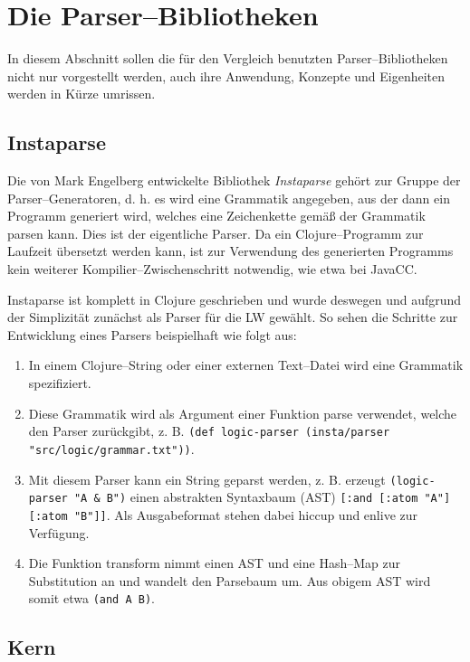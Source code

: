 \documentclass[ngerman,a4paper,abstracton,open=right,twoside=false,toc=listofnumbered,bibtotocnumbered]{scrreprt}
\begin{document}
\section{Die Parser--Bibliotheken}

In diesem Abschnitt sollen die für den Vergleich benutzten Parser--Bibliotheken nicht nur vorgestellt werden, auch ihre Anwendung, Konzepte und Eigenheiten werden in Kürze umrissen.

\subsection{Instaparse}

Die von Mark Engelberg entwickelte Bibliothek \emph{Instaparse} gehört zur Gruppe der Parser--Generatoren, d. h. es wird eine Grammatik angegeben, aus der dann ein Programm generiert wird, welches eine Zeichenkette gemäß der Grammatik parsen kann. Dies ist der eigentliche Parser. Da ein Clojure--Programm zur Laufzeit übersetzt werden kann, ist zur Verwendung des generierten Programms kein weiterer Kompilier--Zwischenschritt notwendig, wie etwa bei JavaCC. \cite{instaparse}

Instaparse ist komplett in Clojure geschrieben und wurde deswegen und aufgrund der Simplizität zunächst als Parser für die LW gewählt. So sehen die Schritte zur Entwicklung eines Parsers beispielhaft wie folgt aus:

\begin{enumerate}
	\item In einem Clojure--String oder einer externen Text--Datei wird eine Grammatik spezifiziert.
	\item Diese Grammatik wird als Argument einer Funktion \glqq{}parse\grqq{} verwendet, welche den Parser zurückgibt, z. B. \lstinline|(def logic-parser (insta/parser "src/logic/grammar.txt"))|.
	\item Mit diesem Parser kann ein String geparst werden, z. B. erzeugt \lstinline|(logic-parser "A & B")| einen abstrakten Syntaxbaum (AST) \lstinline|[:and [:atom "A"] [:atom "B"]]|. Als Ausgabeformat stehen dabei hiccup und enlive zur Verfügung.
	\item Die Funktion \glqq{}transform\grqq{} nimmt einen AST und eine Hash--Map zur Substitution an und wandelt den Parsebaum um. Aus obigem AST wird somit etwa \lstinline|(and A B)|.
\end{enumerate}

\subsection{Kern}
\end{document}
